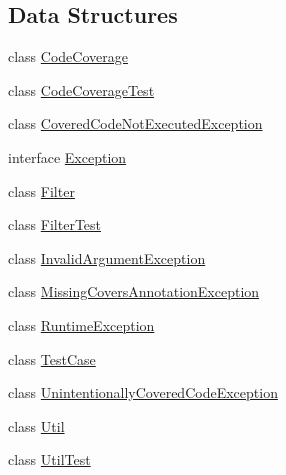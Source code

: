 \subsection*{Data Structures}
\begin{DoxyCompactItemize}
\item 
class \mbox{\hyperlink{class_sebastian_bergmann_1_1_code_coverage_1_1_code_coverage}{Code\+Coverage}}
\item 
class \mbox{\hyperlink{class_sebastian_bergmann_1_1_code_coverage_1_1_code_coverage_test}{Code\+Coverage\+Test}}
\item 
class \mbox{\hyperlink{class_sebastian_bergmann_1_1_code_coverage_1_1_covered_code_not_executed_exception}{Covered\+Code\+Not\+Executed\+Exception}}
\item 
interface \mbox{\hyperlink{interface_sebastian_bergmann_1_1_code_coverage_1_1_exception}{Exception}}
\item 
class \mbox{\hyperlink{class_sebastian_bergmann_1_1_code_coverage_1_1_filter}{Filter}}
\item 
class \mbox{\hyperlink{class_sebastian_bergmann_1_1_code_coverage_1_1_filter_test}{Filter\+Test}}
\item 
class \mbox{\hyperlink{class_sebastian_bergmann_1_1_code_coverage_1_1_invalid_argument_exception}{Invalid\+Argument\+Exception}}
\item 
class \mbox{\hyperlink{class_sebastian_bergmann_1_1_code_coverage_1_1_missing_covers_annotation_exception}{Missing\+Covers\+Annotation\+Exception}}
\item 
class \mbox{\hyperlink{class_sebastian_bergmann_1_1_code_coverage_1_1_runtime_exception}{Runtime\+Exception}}
\item 
class \mbox{\hyperlink{class_sebastian_bergmann_1_1_code_coverage_1_1_test_case}{Test\+Case}}
\item 
class \mbox{\hyperlink{class_sebastian_bergmann_1_1_code_coverage_1_1_unintentionally_covered_code_exception}{Unintentionally\+Covered\+Code\+Exception}}
\item 
class \mbox{\hyperlink{class_sebastian_bergmann_1_1_code_coverage_1_1_util}{Util}}
\item 
class \mbox{\hyperlink{class_sebastian_bergmann_1_1_code_coverage_1_1_util_test}{Util\+Test}}
\end{DoxyCompactItemize}
